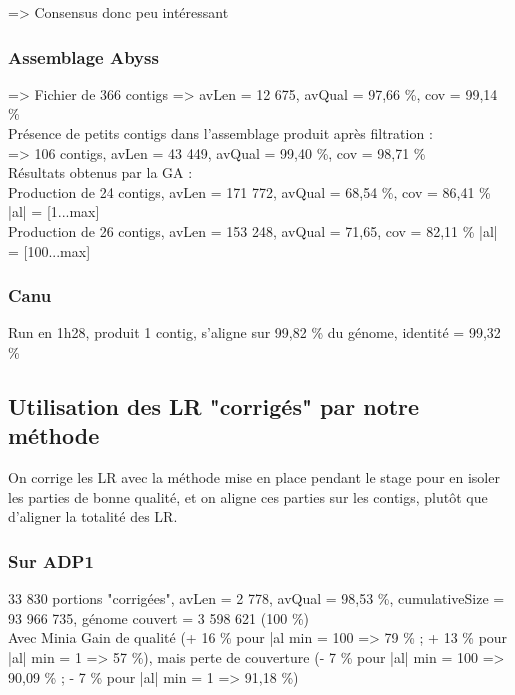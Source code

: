 \documentclass[12pt]{article}
\begin{document}
=> Consensus donc peu intéressant

\subsubsection{Assemblage Abyss}

=> Fichier de 366 contigs => avLen = 12 675, avQual = 97,66 \%, cov = 99,14 \% \\

Présence de petits contigs dans l'assemblage produit après filtration : \\

=> 106 contigs, avLen = 43 449, avQual = 99,40 \%, cov = 98,71 \% \\

Résultats obtenus par la GA : \\

Production de 24 contigs, avLen = 171 772, avQual = 68,54 \%, cov = 86,41 \% |al| = [1...max] \\
Production de 26 contigs, avLen = 153 248, avQual = 71,65, cov = 82,11 \% |al| = [100...max]

\subsubsection{Canu}

Run en 1h28, produit 1 contig, s'aligne sur 99,82 \% du génome, identité = 99,32 \%

\subsection{Utilisation des LR "corrigés" par notre méthode}

On corrige les LR avec la méthode mise en place pendant le stage pour en isoler les parties de bonne qualité, et on aligne ces parties sur les contigs,
plutôt que d'aligner la totalité des LR. \\

\subsubsection{Sur ADP1}

33 830 portions "corrigées", avLen = 2 778, avQual = 98,53 \%, cumulativeSize = 93 966 735, génome couvert = 3 598 621 (100 \%) \\

Avec Minia Gain de qualité (+ 16 \% pour |al min = 100 => 79 \% ; + 13 \% pour |al| min = 1 => 57 \%), 
mais perte de couverture (- 7 \% pour |al| min = 100 => 90,09 \% ; - 7 \% pour |al| min = 1 => 91,18 \%) \\
\end{document}
